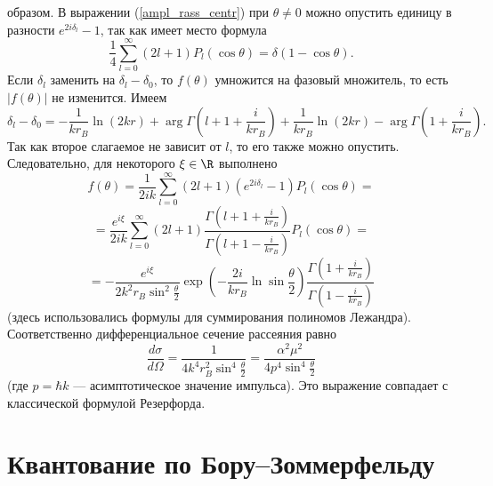 \documentclass[a4paper
]{article}
\begin{document}
образом. В выражении (\ref{ampl_rass_centr}) при $\theta\ne 0$ можно опустить
единицу в разности $e^{2i\delta_l}-1$, так как имеет место формула
$$\frac14 \sum \limits_{l=0}^\infty (2l+1)P_l(\cos \theta)=\delta(1-
\cos \theta).$$ Если $\delta_l$ заменить на $\delta_l-\delta_0$, то
$f(\theta)$ умножится на фазовый множитель, то есть $|f(\theta)|$ не
изменится. Имеем $$\delta_l-\delta_0=-\frac{1}{kr_B}\ln (2kr)+
\arg \Gamma\left(l+1+\frac{i}{kr_B}\right)+\frac{1}{kr_B}\ln (2kr)
-\arg \Gamma\left(1+\frac{i}{kr_B}\right).$$ Так как второе слагаемое
не зависит от $l$, то его также можно опустить. Следовательно, для некоторого
$\xi\in \R$ выполнено
$$f(\theta)=\frac{1}{2ik}\sum \limits_{l=0}^\infty (2l+1)(e^{2i\delta_l}-1)
P_l(\cos \theta)=$$ $$=\frac{e^{i\xi}}{2ik}\sum \limits_{l=0}^\infty
(2l+1)
\frac{\Gamma\left(l+1+\frac{i}{kr_B}\right)}{\Gamma\left(l+1-\frac{i}{kr_B}
\right)}P_l(\cos
\theta)=$$$$=-\frac{e^{i\xi}}{2k^2r_B\sin^2\frac{\theta}{2}}\exp
\left(-\frac{2i}{kr_B}\ln \sin
\frac{\theta}{2}\right)\frac{\Gamma\left(
1+\frac{i}{kr_B}\right)}{\Gamma\left(1-\frac{i}{kr_B}\right)}$$
(здесь использовались формулы для суммирования полиномов
Лежандра). Соответственно дифференциальное сечение рассеяния равно
$$\frac{d\sigma}{d\Omega}=\frac{1}{4k^4r_B^2\sin^4
\frac{\theta}{2}}=\frac{\alpha^2\mu^2}{4p^4
\sin^4\frac{\theta}{2}}$$ (где $p=\hbar k$ --- асимптотическое
значение импульса). Это выражение совпадает с классической
формулой Резерфорда.
\section{Квантование по Бору--Зоммерфельду}
\end{document}
